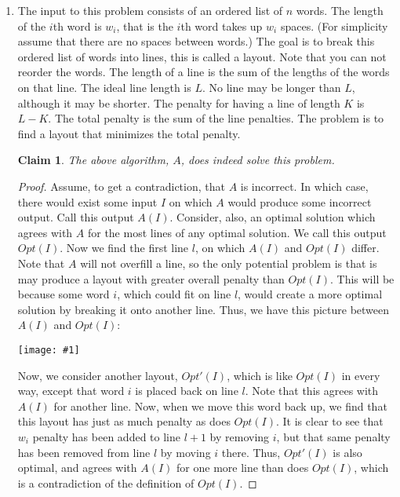 \documentclass{article}
\newtheorem{thm}{Claim}
\providecommand{\image}[1]{
    \begin{center}
        \texttt{[image: \#1]}
    \end{center}
}
\begin{document}
    \begin{enumerate}[label=(\alph*)]
        \item The input to this problem consists of an ordered list of $n$ words. 
        The length of the $i$th word is $w_i$, that is the $i$th word takes up $w_i$ spaces. 
        (For simplicity assume that there are no spaces between words.)
        The goal is to break this ordered list of words into lines, this is called a layout. 
        Note that you can not reorder the words. 
        The length of a line is the sum of the lengths of the words on that line. 
        The ideal line length is $L$. 
        No line may be longer than $L$, although it may be shorter. 
        The penalty for having a line of length $K$ is $L − K$. 
        The total penalty is the sum of the line penalties.
        The problem is to find a layout that minimizes the total penalty.
        
        \begin{thm}
        	The above algorithm, $A$, does indeed solve this problem.
        \end{thm}
        \begin{proof}
        	Assume, to get a contradiction, that $A$ is incorrect.
        	In which case, there would exist some input $I$ on which $A$ would produce some incorrect output.
        	Call this output $A(I)$.
        	Consider, also, an optimal solution which agrees with $A$ for the most lines of any optimal solution.
        	We call this output $Opt(I)$.
        	Now we find the first line $l$, on which $A(I)$ and $Opt(I)$ differ.
        	Note that $A$ will not overfill a line, so the only potential problem is that is may produce a layout with greater overall penalty than $Opt(I)$.
        	This will be because some word $i$, which could fit on line $l$, would create a more optimal solution by breaking it onto another line.
        	Thus, we have this picture between $A(I)$ and $Opt(I)$:
        	
        	\image{p6a}
        	
        	Now, we consider another layout, $Opt'(I)$, which is like $Opt(I)$ in every way, except that word $i$ is placed back on line $l$. Note that this agrees with $A(I)$ for another line.
        	Now, when we move this word back up, we find that this layout has just as much penalty as does $Opt(I)$.
        	It is clear to see that $w_i$ penalty has been added to line $l+1$ by removing $i$, but that same penalty has been removed from line $l$ by moving $i$ there.
        	Thus, $Opt'(I)$ is also optimal, and agrees with $A(I)$ for one more line than does $Opt(I)$, which is a contradiction of the definition of $Opt(I)$.
        	

\end{proof}
\end{enumerate}
\end{document}
